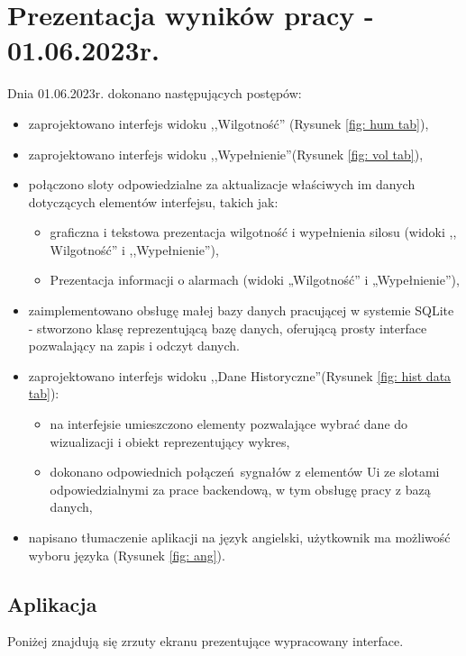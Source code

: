 \section{Prezentacja wyników pracy - 01.06.2023r.}
    Dnia 01.06.2023r. dokonano następujących postępów:
    \begin{itemize}
        \item zaprojektowano interfejs widoku ,,Wilgotność'' (Rysunek \ref{fig: hum tab}),
        \item zaprojektowano interfejs widoku ,,Wypełnienie''(Rysunek \ref{fig: vol tab}),
        \item połączono sloty odpowiedzialne za aktualizacje właściwych im danych dotyczących elementów
        interfejsu, takich jak:
            \begin{itemize}
                \item graficzna i tekstowa prezentacja wilgotność i wypełnienia silosu (widoki ,, Wilgotność'' i ,,Wypełnienie''),
                \item Prezentacja informacji o alarmach (widoki „Wilgotność” i „Wypełnienie”),
            \end{itemize}
        \item zaimplementowano obsługę małej bazy danych pracującej w systemie SQLite - stworzono klasę reprezentującą bazę danych, oferującą
        prosty interface pozwalający na zapis i odczyt danych.
        \item zaprojektowano interfejs widoku ,,Dane Historyczne''(Rysunek \ref{fig: hist data tab}):
        \begin{itemize}
            \item na interfejsie umieszczono elementy pozwalające wybrać dane do wizualizacji i obiekt reprezentujący wykres,
            \item dokonano odpowiednich połączeń sygnałów z elementów Ui ze slotami odpowiedzialnymi za prace backendową, w tym obsługę pracy z bazą danych,
        \end{itemize}
        \item napisano tłumaczenie aplikacji na język angielski, użytkownik ma możliwość wyboru języka (Rysunek \ref{fig: ang}).
    \end{itemize}
    \subsection{Aplikacja}
    Poniżej znajdują się zrzuty ekranu prezentujące wypracowany interface.

